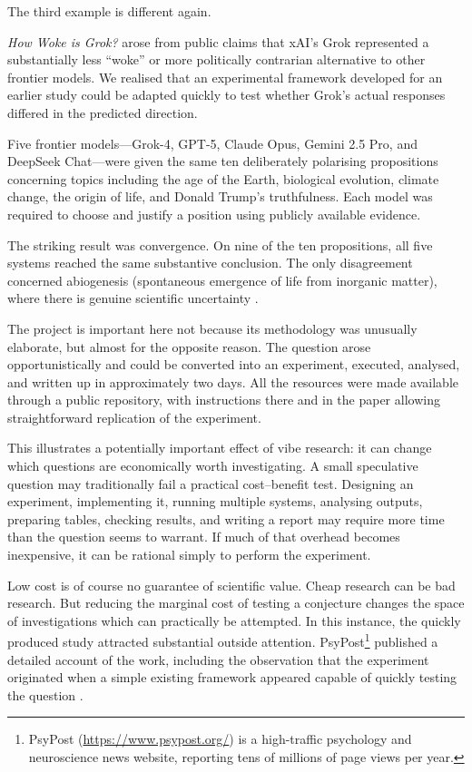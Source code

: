 \documentclass[12pt]{article}
\begin{document}
The third example is different again.

\emph{How Woke is Grok?} \citep{raynerChatGPT2025grok} arose from public claims that xAI's Grok represented a substantially less ``woke'' or more politically contrarian alternative to other frontier models. We realised that an experimental framework developed for an earlier study could be adapted quickly to test whether Grok's actual responses differed in the predicted direction.

Five frontier models---Grok-4, GPT-5, Claude Opus, Gemini 2.5 Pro, and DeepSeek Chat---were given the same ten deliberately polarising propositions concerning topics including the age of the Earth, biological evolution, climate change, the origin of life, and Donald Trump's truthfulness. Each model was required to choose and justify a position using publicly available evidence.

The striking result was convergence. On nine of the ten propositions, all five systems reached the same substantive conclusion. The only disagreement concerned abiogenesis (spontaneous emergence of life from inorganic matter), where there is genuine scientific uncertainty \citep[Section~4]{raynerChatGPT2025grok}.

The project is important here not because its methodology was unusually elaborate, but almost for the opposite reason. The question arose opportunistically and could be converted into an experiment, executed, analysed, and written up in approximately two days. All the resources were made available through a public repository, with instructions there and in the paper allowing straightforward replication of the experiment. 

This illustrates a potentially important effect of vibe research: it can change which questions are economically worth investigating. A small speculative question may traditionally fail a practical cost--benefit test. Designing an experiment, implementing it, running multiple systems, analysing outputs, preparing tables, checking results, and writing a report may require more time than the question seems to warrant. If much of that overhead becomes inexpensive, it can be rational simply to perform the experiment.

Low cost is of course no guarantee of scientific value. Cheap research can be bad research. But reducing the marginal cost of testing a conjecture changes the space of investigations which can practically be attempted.
In this instance, the quickly produced study attracted substantial outside attention. PsyPost\footnote{PsyPost (\url{https://www.psypost.org/}) is a high-traffic psychology and neuroscience news website, reporting tens of millions of page views per year.} published a detailed account of the work, including the observation that the experiment originated when a simple existing framework appeared capable of quickly testing the question \citep{dolan2025grok}.
\end{document}
